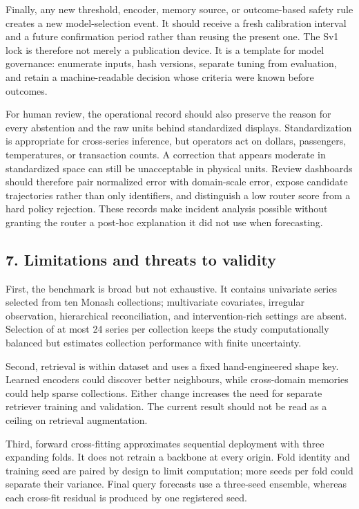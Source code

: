 \documentclass[
]{article}
\begin{document}
Finally, any new threshold, encoder, memory source, or outcome-based
safety rule creates a new model-selection event. It should receive a
fresh calibration interval and a future confirmation period rather than
reusing the present one. The Sv1 lock is therefore not merely a
publication device. It is a template for model governance: enumerate
inputs, hash versions, separate tuning from evaluation, and retain a
machine-readable decision whose criteria were known before outcomes.

For human review, the operational record should also preserve the reason
for every abstention and the raw units behind standardized displays.
Standardization is appropriate for cross-series inference, but operators
act on dollars, passengers, temperatures, or transaction counts. A
correction that appears moderate in standardized space can still be
unacceptable in physical units. Review dashboards should therefore pair
normalized error with domain-scale error, expose candidate trajectories
rather than only identifiers, and distinguish a low router score from a
hard policy rejection. These records make incident analysis possible
without granting the router a post-hoc explanation it did not use when
forecasting.

\subsection{7. Limitations and threats to
validity}\label{7-limitations-and-threats-to-validity}

First, the benchmark is broad but not exhaustive. It contains univariate
series selected from ten Monash collections; multivariate covariates,
irregular observation, hierarchical reconciliation, and
intervention-rich settings are absent. Selection of at most 24 series
per collection keeps the study computationally balanced but estimates
collection performance with finite uncertainty.

Second, retrieval is within dataset and uses a fixed hand-engineered
shape key. Learned encoders could discover better neighbours, while
cross-domain memories could help sparse collections. Either change
increases the need for separate retriever training and validation. The
current result should not be read as a ceiling on retrieval
augmentation.

Third, forward cross-fitting approximates sequential deployment with
three expanding folds. It does not retrain a backbone at every origin.
Fold identity and training seed are paired by design to limit
computation; more seeds per fold could separate their variance. Final
query forecasts use a three-seed ensemble, whereas each cross-fit
residual is produced by one registered seed.
\end{document}
